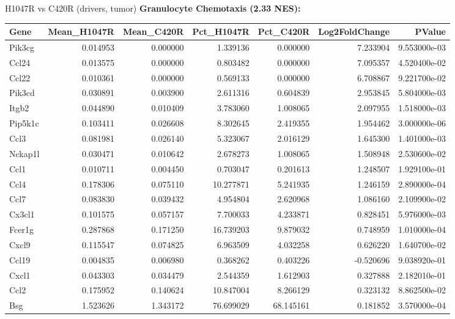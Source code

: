 \documentclass[10pt, aspectratio=169]{beamer}
\begin{document}
\begin{frame}{H1047R vs C420R (drivers, tumor)}
  \centering
  {\small \textbf{Granulocyte Chemotaxis (2.33 NES):}}\par
  \vspace{0.15cm}
  \tiny
  \begin{tabular}{l r r r r r r}
    \toprule
    \textbf{Gene} & \textbf{Mean\_H1047R} & \textbf{Mean\_C420R} & \textbf{Pct\_H1047R} & \textbf{Pct\_C420R} & \textbf{Log2FoldChange} & \textbf{PValue} \\
    \midrule
    Pik3cg & 0.014953 & 0.000000 & 1.339136 & 0.000000 & 7.233904 & 9.553000e-03 \\
    Ccl24 & 0.013575 & 0.000000 & 0.803482 & 0.000000 & 7.095357 & 4.520400e-02 \\
    Ccl22 & 0.010361 & 0.000000 & 0.569133 & 0.000000 & 6.708867 & 9.221700e-02 \\
    Pik3cd & 0.030891 & 0.003900 & 2.611316 & 0.604839 & 2.953845 & 5.804000e-03 \\
    Itgb2 & 0.044890 & 0.010409 & 3.783060 & 1.008065 & 2.097955 & 1.518000e-03 \\
    Pip5k1c & 0.103411 & 0.026608 & 8.302645 & 2.419355 & 1.954462 & 3.000000e-06 \\
    Ccl3 & 0.081981 & 0.026140 & 5.323067 & 2.016129 & 1.645300 & 1.401000e-03 \\
    Nckap1l & 0.030471 & 0.010642 & 2.678273 & 1.008065 & 1.508948 & 2.530600e-02 \\
    Ccl1 & 0.010711 & 0.004450 & 0.703047 & 0.201613 & 1.248507 & 1.929100e-01 \\
    Ccl4 & 0.178306 & 0.075110 & 10.277871 & 5.241935 & 1.246159 & 2.890000e-04 \\
    Ccl7 & 0.083830 & 0.039432 & 4.954804 & 2.620968 & 1.086160 & 2.109900e-02 \\
    Cx3cl1 & 0.101575 & 0.057157 & 7.700033 & 4.233871 & 0.828451 & 5.976000e-03 \\
    Fcer1g & 0.287868 & 0.171250 & 16.739203 & 9.879032 & 0.748959 & 1.010000e-04 \\
    Cxcl9 & 0.115547 & 0.074825 & 6.963509 & 4.032258 & 0.626220 & 1.640700e-02 \\
    Ccl19 & 0.004835 & 0.006980 & 0.368262 & 0.403226 & -0.520696 & 9.038920e-01 \\
    Cxcl1 & 0.043303 & 0.034479 & 2.544359 & 1.612903 & 0.327888 & 2.182010e-01 \\
    Ccl2 & 0.175952 & 0.140624 & 10.847004 & 8.266129 & 0.323132 & 8.862500e-02 \\
    Bsg & 1.523626 & 1.343172 & 76.699029 & 68.145161 & 0.181852 & 3.570000e-04 \\
    \bottomrule
  \end{tabular}
\end{frame}
\end{document}

